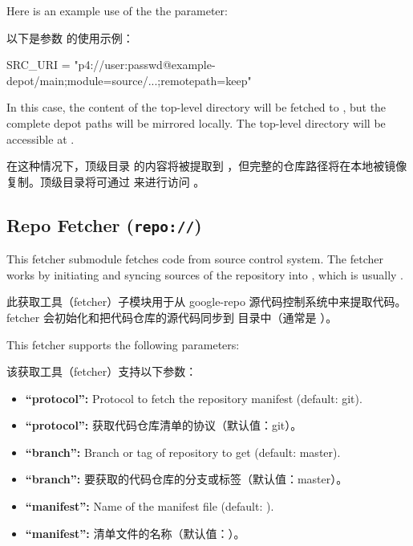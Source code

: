 Here is an example use of the the  parameter:

以下是参数  的使用示例：

\begin{pyglist}
SRC_URI = "p4://user:passwd@example-depot/main;module=source/...;remotepath=keep"
\end{pyglist}

In this case, the content of the top-level directory  will be fetched to , but the complete depot paths will be mirrored locally. The top-level directory will be accessible at .

在这种情况下，顶级目录  的内容将被提取到 ，但完整的仓库路径将在本地被镜像复制。顶级目录将可通过  来进行访问 。

\subsection{Repo Fetcher (\texttt{repo://})}

This fetcher submodule fetches code from  source control system. The fetcher works by initiating and syncing sources of the repository into , which is usually .

此获取工具（fetcher）子模块用于从 google-repo 源代码控制系统中来提取代码。fetcher 会初始化和把代码仓库的源代码同步到  目录中（通常是  ）。

This fetcher supports the following parameters:

该获取工具（fetcher）支持以下参数：

\begin{itemize}
\setlength\itemsep{1.0em}
\item \textbf{``protocol'':} Protocol to fetch the repository manifest (default: git).
\item \textbf{``protocol'':} 获取代码仓库清单的协议（默认值：git）。

\item \textbf{``branch'':} Branch or tag of repository to get (default: master).
\item \textbf{``branch'':} 要获取的代码仓库的分支或标签（默认值：master）。

\item \textbf{``manifest'':} Name of the manifest file (default: ).
\item \textbf{``manifest'':} 清单文件的名称（默认值：）。
\end{itemize}

